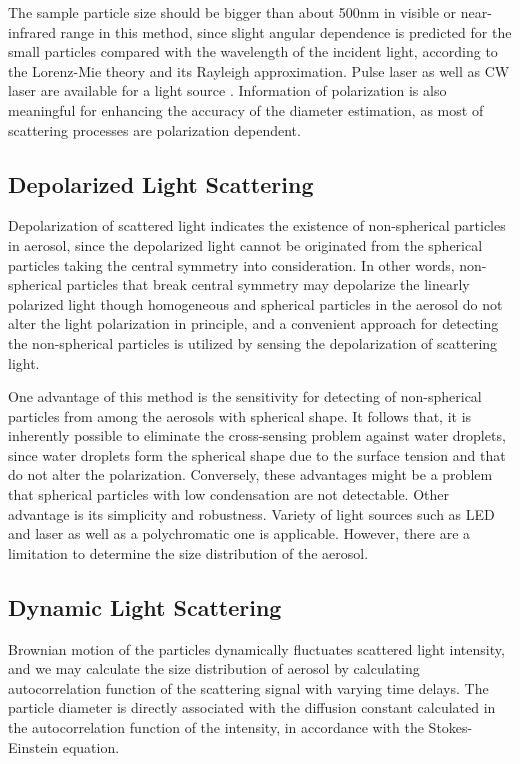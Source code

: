\documentclass[12pt]{article}
\begin{document}
The sample particle size should be bigger than about 500nm in visible or near-infrared range in this method, since slight angular dependence is predicted for the small particles compared with the wavelength of the incident light, according to the Lorenz-Mie theory and its Rayleigh approximation.
Pulse laser as well as CW laser are available for a light source .
Information of polarization is also meaningful for enhancing the accuracy of the diameter estimation, as most of scattering processes are polarization dependent.


\subsection{Depolarized Light Scattering}
\label{sec:depolarized_scattering}
Depolarization of scattered light indicates the existence of non-spherical particles in aerosol, since the depolarized light cannot be originated from the spherical particles taking the central symmetry into consideration\cite{Experiment2_Depolarization}\cite{Calculation1_Depolarization}\cite{Calculation2_Depolarization}. In other words, non-spherical particles that break central symmetry may depolarize the linearly polarized light though homogeneous and spherical particles in the aerosol do not alter the light polarization in principle, and a convenient approach for detecting the non-spherical particles is utilized by sensing the depolarization of scattering light.

One advantage of this method is the sensitivity for detecting of non-spherical particles from among the aerosols with spherical shape. It follows that, it is inherently possible to eliminate the cross-sensing problem against water droplets, since water droplets form the spherical shape due to the surface tension and that do not alter the polarization. Conversely, these advantages might be a problem that spherical particles with low condensation are not detectable.
Other advantage is its simplicity and robustness. Variety of light sources such as LED and laser as well as a polychromatic one is applicable. 
However, there are a limitation to determine the size distribution of the aerosol.

\subsection{Dynamic Light Scattering}
Brownian motion of the particles dynamically fluctuates scattered light intensity, and we may calculate the size distribution of aerosol by calculating autocorrelation function of the scattering signal with varying time delays\cite{Brownian_DLS}. The particle diameter is directly associated with the diffusion constant calculated in the autocorrelation function of the intensity, in accordance with the Stokes-Einstein equation.
\end{document}
